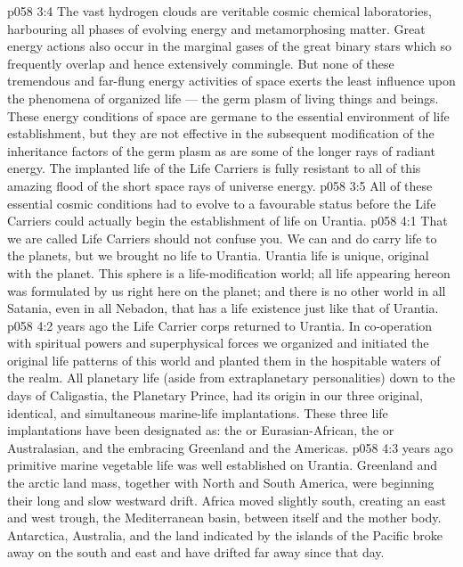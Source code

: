 \vs p058 3:4 The vast hydrogen clouds are veritable cosmic chemical laboratories, harbouring all phases of evolving energy and metamorphosing matter. Great energy actions also occur in the marginal gases of the great binary stars which so frequently overlap and hence extensively commingle. But none of these tremendous and far\hyp{}flung energy activities of space exerts the least influence upon the phenomena of organized life --- the germ plasm of living things and beings. These energy conditions of space are germane to the essential environment of life establishment, but they are not effective in the subsequent modification of the inheritance factors of the germ plasm as are some of the longer rays of radiant energy. The implanted life of the Life Carriers is fully resistant to all of this amazing flood of the short space rays of universe energy.
\vs p058 3:5 \pc All of these essential cosmic conditions had to evolve to a favourable status before the Life Carriers could actually begin the establishment of life on Urantia.
\vs p058 4:1 That we are called Life Carriers should not confuse you. We can and do carry life to the planets, but we brought no life to Urantia. Urantia life is unique, original with the planet. This sphere is a life\hyp{}modification world; all life appearing hereon was formulated by us right here on the planet; and there is no other world in all Satania, even in all Nebadon, that has a life existence just like that of Urantia.
\vs p058 4:2 \pc {} years ago the Life Carrier corps returned to Urantia. In co\hyp{}operation with spiritual powers and superphysical forces we organized and initiated the original life patterns of this world and planted them in the hospitable waters of the realm. All planetary life (aside from extraplanetary personalities) down to the days of Caligastia, the Planetary Prince, had its origin in our three original, identical, and simultaneous marine\hyp{}life implantations. These three life implantations have been designated as: the  or Eurasian\hyp{}African, the  or Australasian, and the  embracing Greenland and the Americas.
\vs p058 4:3 \pc {} years ago primitive marine vegetable life was well established on Urantia. Greenland and the arctic land mass, together with North and South America, were beginning their long and slow westward drift. Africa moved slightly south, creating an east and west trough, the Mediterranean basin, between itself and the mother body. Antarctica, Australia, and the land indicated by the islands of the Pacific broke away on the south and east and have drifted far away since that day.
